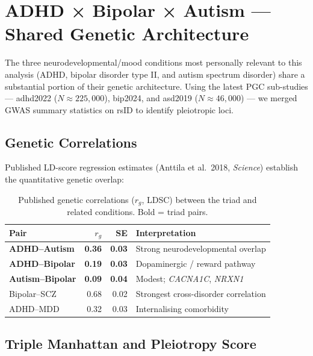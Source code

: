 \documentclass[11pt, a4paper]{article}
\begin{document}
\section{ADHD × Bipolar × Autism — Shared Genetic Architecture}

The three neurodevelopmental/mood conditions most personally relevant to
this analysis (ADHD, bipolar disorder type II, and autism spectrum disorder)
share a substantial portion of their genetic architecture. Using the latest
PGC sub-studies — adhd2022 ($N\approx225{,}000$), bip2024, and asd2019
($N\approx46{,}000$) — we merged GWAS summary statistics on rsID to identify
pleiotropic loci.

\subsection{Genetic Correlations}

Published LD-score regression estimates (Anttila et al.\ 2018, \textit{Science})
establish the quantitative genetic overlap:

\begin{table}[H]
\centering
\caption{Published genetic correlations ($r_g$, LDSC) between the triad and
         related conditions. Bold = triad pairs.}
\label{tab:rg}
\begin{tabular}{lrrl}
\toprule
Pair & $r_g$ & SE & Interpretation \\
\midrule
\textbf{ADHD–Autism}     & \textbf{0.36} & \textbf{0.03} & Strong neurodevelopmental overlap \\
\textbf{ADHD–Bipolar}    & \textbf{0.19} & \textbf{0.03} & Dopaminergic / reward pathway \\
\textbf{Autism–Bipolar}  & \textbf{0.09} & \textbf{0.04} & Modest; \textit{CACNA1C}, \textit{NRXN1} \\
Bipolar–SCZ              & 0.68 & 0.02 & Strongest cross-disorder correlation \\
ADHD–MDD                 & 0.32 & 0.03 & Internalising comorbidity \\
\bottomrule
\end{tabular}
\end{table}

\subsection{Triple Manhattan and Pleiotropy Score}
\end{document}
